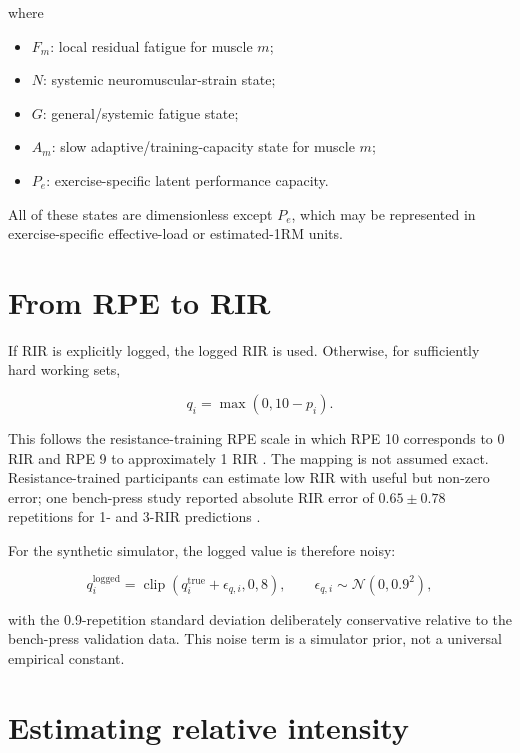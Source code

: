 \documentclass[11pt]{article}
\begin{document}
where

\begin{itemize}
    \item $F_m$: local residual fatigue for muscle $m$;
    \item $N$: systemic neuromuscular-strain state;
    \item $G$: general/systemic fatigue state;
    \item $A_m$: slow adaptive/training-capacity state for muscle $m$;
    \item $P_e$: exercise-specific latent performance capacity.
\end{itemize}

All of these states are dimensionless except $P_e$, which may be represented in exercise-specific effective-load or estimated-1RM units.

\section{From RPE to RIR}

If RIR is explicitly logged, the logged RIR is used. Otherwise, for sufficiently hard working sets,

\begin{equation}
q_i = \max(0,10-p_i).
\end{equation}

This follows the resistance-training RPE scale in which RPE 10 corresponds to 0 RIR and RPE 9 to approximately 1 RIR \cite{zourdos2016}. The mapping is not assumed exact. Resistance-trained participants can estimate low RIR with useful but non-zero error; one bench-press study reported absolute RIR error of $0.65\pm0.78$ repetitions for 1- and 3-RIR predictions \cite{refalo2024}.

For the synthetic simulator, the logged value is therefore noisy:

\begin{equation}
q_i^{\mathrm{logged}}=\operatorname{clip}\left(q_i^{\mathrm{true}}+\epsilon_{q,i},0,8\right),
\qquad
\epsilon_{q,i}\sim\mathcal{N}(0,0.9^2),
\end{equation}

with the 0.9-repetition standard deviation deliberately conservative relative to the bench-press validation data. This noise term is a simulator prior, not a universal empirical constant.

\section{Estimating relative intensity}
\end{document}
